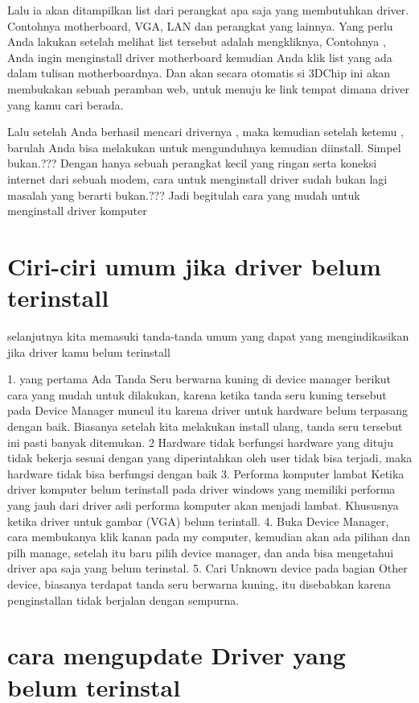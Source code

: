 Lalu ia akan ditampilkan list dari perangkat apa saja yang membutuhkan driver. Contohnya motherboard, VGA, LAN dan perangkat yang lainnya. Yang perlu Anda lakukan setelah melihat list tersebut adalah mengkliknya, Contohnya , Anda ingin menginstall driver motherboard kemudian Anda klik  list yang ada  dalam tulisan motherboardnya. Dan akan secara otomatis si 3DChip ini akan membukakan sebuah peramban web, untuk menuju ke link tempat dimana driver yang kamu cari berada.

Lalu setelah Anda berhasil mencari drivernya , maka kemudian setelah ketemu , barulah Anda bisa melakukan untuk  mengunduhnya kemudian diinstall. Simpel bukan.??? Dengan hanya sebuah perangkat kecil yang ringan serta koneksi internet dari sebuah modem, cara untuk menginstall driver sudah bukan lagi masalah yang berarti bukan.??? Jadi begitulah  cara yang mudah untuk  menginstall driver komputer 




\section{Ciri-ciri umum jika driver belum terinstall}
selanjutnya kita memasuki tanda-tanda umum yang dapat yang mengindikasikan jika driver kamu belum terinstall

1. yang pertama Ada Tanda Seru berwarna kuning di device manager
berikut  cara yang mudah untuk dilakukan, karena ketika tanda seru kuning  tersebut pada Device Manager muncul itu karena driver untuk hardware belum terpasang dengan baik. Biasanya setelah kita melakukan install ulang, tanda seru tersebut ini pasti banyak ditemukan. 
2 Hardware tidak berfungsi
 hardware yang dituju tidak  bekerja sesuai dengan yang diperintahkan oleh user tidak bisa terjadi, maka hardware tidak bisa berfungsi dengan baik
3. Performa komputer lambat
Ketika driver komputer belum terinstall pada driver windows yang memiliki performa yang jauh dari driver asli performa komputer akan menjadi lambat. Khususnya ketika driver untuk gambar (VGA) belum terintall. 
4. Buka Device Manager, cara membukanya klik kanan pada my computer, kemudian akan ada pilihan dan pilh manage, setelah itu baru pilih device manager, dan anda bisa mengetahui driver apa saja yang belum terinstal.
5. Cari Unknown device pada bagian Other device, biasanya terdapat tanda seru berwarna kuning, itu disebabkan karena penginstallan tidak berjalan dengan sempurna.

\section{cara mengupdate Driver yang belum terinstal}


